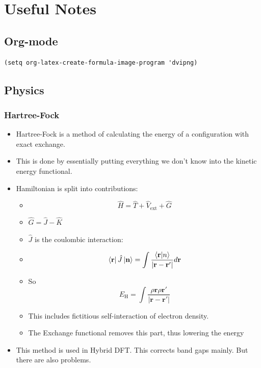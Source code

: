 \documentclass[11pt]{article}
\begin{document}
\section{Useful Notes}
\label{sec:orge9bcc02}
\subsection{Org-mode}
\label{sec:org120a75d}
\begin{verbatim}
(setq org-latex-create-formula-image-program 'dvipng)
\end{verbatim}

\subsection{Physics}
\label{sec:org888a0c7}
\subsubsection{Hartree-Fock}
\label{sec:org987b14d}
\begin{itemize}
\item Hartree-Fock is a method of calculating the energy of a configuration
with exact exchange.
\item This is done by essentially putting everything we don't know into the
kinetic energy functional.
\item Hamiltonian is split into contributions:
\begin{itemize}
\item \[\hat{H} = \hat{T} + \hat{V}_{ \text{ext} } + \hat{G}\]
\item \(\hat{G} = \hat{J} - \hat{K}\)
\item \(\hat{J}\) is the coulombic interaction:
\item \[ \bra{ \mathbf{r} } \hat{J} \ket{ \mathbf{n} } = \int \frac{ \bra{\mathbf{r}}\ket{n} }{|\mathbf{r} - \mathbf{r'}  |}d\mathbf{r} \]
\item So \[ E_{\text{H}} = \int \frac{\rho{\mathbf{r}\rho{\mathbf{r}'}}}{|\mathbf{r} - \mathbf{r'}|}\]
\item This includes fictitious self-interaction of electron density.
\item The Exchange functional removes this part, thus lowering the energy
\end{itemize}

\item This method is used in Hybrid DFT. This corrects band gaps mainly. But
there are also problems.
\end{itemize}
\end{document}
